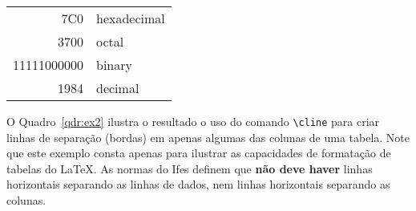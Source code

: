 \documentclass[times,english,brazil,oneside,section=TITLE]{ifes8}
\begin{document}
\begin{quadro}[htb]
  \begin{center}
    \caption{Exemplo de uso de \texttt{cline} para formatação de quadros.}
    \label{qdr:ex2}
    \begin{tabular}{|r|l|}
      \hline
      7C0         & hexadecimal \\
      3700        & octal       \\ \cline{2-2}
      11111000000 & binary      \\
      \hline
      \hline
      1984        & decimal     \\
      \hline
    \end{tabular}
  \end{center}
\end{quadro}

O Quadro~\ref{qdr:ex2} ilustra o resultado o uso do comando
\verb!\cline! para criar linhas de separação (bordas) em apenas
algumas das colunas de uma tabela. Note que este exemplo consta apenas
para ilustrar as capacidades de formatação de tabelas do \LaTeX. As
normas do Ifes definem que \textbf{não deve haver} linhas horizontais
separando as linhas de dados, nem linhas horizontais separando as
colunas.
\end{document}
